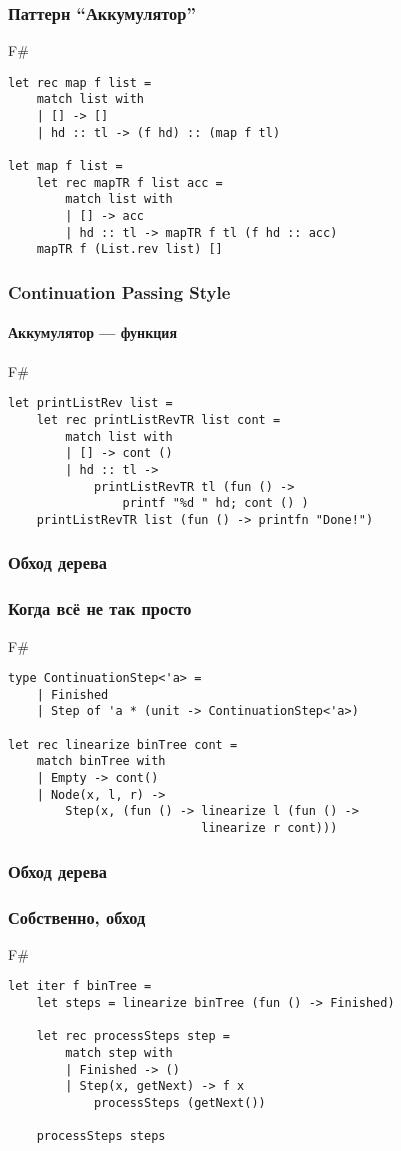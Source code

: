 \documentclass[xetex,mathserif,serif]{beamer}
\begin{document}
	\begin{frame}[fragile]
		\frametitle{Паттерн ``Аккумулятор''}
		\begin{exampleblock}{F\#}
			\begin{verbatim}
let rec map f list =
    match list with
    | [] -> []
    | hd :: tl -> (f hd) :: (map f tl)

let map f list =
    let rec mapTR f list acc =
        match list with
        | [] -> acc
        | hd :: tl -> mapTR f tl (f hd :: acc)
    mapTR f (List.rev list) []
			\end{verbatim}
		\end{exampleblock}
\end{frame}

	\begin{frame}[fragile]
		\frametitle{Continuation Passing Style}
		\framesubtitle{Аккумулятор --- функция}
		\begin{exampleblock}{F\#}
			\begin{verbatim}
let printListRev list =
    let rec printListRevTR list cont =
        match list with
        | [] -> cont ()
        | hd :: tl ->
            printListRevTR tl (fun () -> 
                printf "%d " hd; cont () )
    printListRevTR list (fun () -> printfn "Done!")
			\end{verbatim}
		\end{exampleblock}
\end{frame}

	\begin{frame}[fragile]
		\frametitle{Обход дерева}
		\frametitle{Когда всё не так просто}
		\begin{exampleblock}{F\#}
			\begin{verbatim}
type ContinuationStep<'a> =
    | Finished
    | Step of 'a * (unit -> ContinuationStep<'a>)

let rec linearize binTree cont =
    match binTree with
    | Empty -> cont()
    | Node(x, l, r) ->
        Step(x, (fun () -> linearize l (fun () -> 
                           linearize r cont)))
			\end{verbatim}
		\end{exampleblock}
\end{frame}

	\begin{frame}[fragile]
		\frametitle{Обход дерева}
		\frametitle{Собственно, обход}
		\begin{exampleblock}{F\#}
			\begin{verbatim}
let iter f binTree =
    let steps = linearize binTree (fun () -> Finished)

    let rec processSteps step =
        match step with
        | Finished -> ()
        | Step(x, getNext) -> f x
            processSteps (getNext())
    
    processSteps steps
			\end{verbatim}
		\end{exampleblock}
\end{frame}
\end{document}
